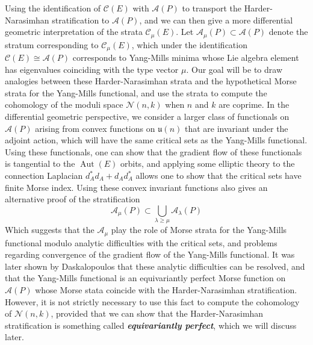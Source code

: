 \documentclass[psamsfonts, 12pt]{amsart}
\theoremstyle{definition}
\theoremstyle{remark}
\newcommand{\ib}[1]{\textbf{\textit{#1}}}
\DeclareMathOperator{\Aut}{Aut}
\begin{document}
Using the identification of $\mathscr{C}(E)$ with $\mathscr{A}(P)$ to
transport the Harder-Narasimhan stratification to $\mathscr{A}(P)$, and we can then
give a more differential geometric interpretation of the strata $\mathscr{C}_\mu(E)$.
Let $\mathscr{A}_\mu(P) \subset \mathscr{A}(P)$ denote the stratum corresponding
to $\mathscr{C}_\mu(E)$, which under the identification
$\mathscr{C}(E) \cong \mathscr{A}(P)$ corresponds to Yang-Mills minima whose Lie
algebra element has eigenvalues coinciding with the type vector $\mu$.
Our goal will be to draw analogies between these Harder-Narasimhan strata and the
hypothetical Morse strata for the Yang-Mills functional, and use the strata to
compute the cohomology of the moduli space $\mathcal{N}(n,k)$ when $n$ and $k$ are
coprime. In the differential geometric perspective, we consider a
larger class of functionals on $\mathscr{A}(P)$ arising from convex
functions on $\mathfrak{u}(n)$ that are invariant under the adjoint action,
which will have the same critical sets as the Yang-Mills functional. Using
these functionals, one can show that the gradient flow of these functionals is
tangential to the $\Aut(E)$ orbits, and applying some elliptic theory to
the connection Laplacian $d_A^*d_A + d_Ad_A^*$ allows one to show that
the critical sets have finite Morse index. Using these convex invariant
functions also gives an alternative proof of the stratification
\[
\mathscr{A}_\mu(P) \subset \bigcup_{\lambda \geq \mu} \mathscr{A}_\lambda(P)
\]
Which suggests that the $\mathscr{A}_\mu$ play the role of Morse strata for the
Yang-Mills functional modulo analytic difficulties with the critical sets, and
problems regarding convergence of the gradient flow of the Yang-Mills functional.
It was later shown by Daskalopoulos \cite{daskalopoulos1992} that these analytic
difficulties can be resolved, and that the Yang-Mills functional is an equivariantly
perfect Morse function on $\mathscr{A}(P)$ whose Morse stata coincide with the
Harder-Narasimhan stratification. However, it is not strictly necessary to
use this fact to compute the cohomology of $\mathcal{N}(n,k)$, provided that we can
show that the Harder-Narasimhan stratification is something called
\ib{equivariantly perfect}, which we will discuss later.
%
\end{document}
